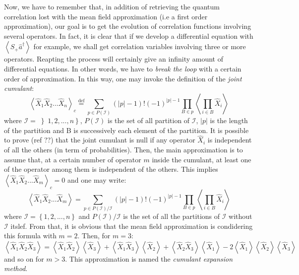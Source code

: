 \documentclass[12pt]{report}
\begin{document}
Now, we have to remember that, in addition of retrieving the quantum correlation lost with the mean field approximation (i.e a first order approximation), our goal is to get the evolution of correlation functions involving several operators. In fact, it is clear that if we develop a differential equation with $\left\langle\hat{S}_+ \hat{a}^\dagger\right\rangle$ for example, we shall get correlation variables involving three or more operators. Reapting the process will certainly give an infinity amount of differential equations. In other words, we have to \textit{break the loop} with a certain order of approximation. In this way, one may invoke the definition of the \textit{joint cumulant}:
\begin{equation}
\left\langle\hat{X}_1\hat{X}_2...\hat{X}_n\right\rangle_c \stackrel{\text{def}}{=} \sum_{p \in P(\mathcal{I})} (\vert p \vert - 1)!(-1)^{\vert p \vert -1} \prod_{B \in p} \left\langle \prod_{i \in B}\hat{X}_i\right\rangle
\end{equation}
where $\mathcal{I} = \left\rbrace 1,2, ..., n \right\rbrace$, $P(\mathcal{I})$ is the set of all partition of $\mathcal{I}$, $\vert p \vert$ is the length of the partition and B is successively each element of the partition. It is possible to prove (ref ??) that the joint cumulant is null if any operator $\hat{X}_i$ is independent of all the others (in term of probabilities). Then, the main approximation is to assume that, at a certain number of operator $m$ inside the cumulant, at least one of the operator among them is independent of the others. This implies $\left\langle\hat{X}_1\hat{X}_2...\hat{X}_m\right\rangle_c = 0$ and one may write:
\begin{equation}
\left\langle\hat{X}_1\hat{X}_2...\hat{X}_m\right\rangle = \sum_{p \in P(\mathcal{I})/\mathcal{I}} (\vert p \vert - 1)!(-1)^{\vert p \vert -1} \prod_{B \in p} \left\langle \prod_{i \in B}\hat{X}_i\right\rangle
\end{equation}
where $\mathcal{I} = \left\lbrace 1,2, ..., n \right\rbrace$ and $P(\mathcal{I})/\mathcal{I}$ is the set of all the partitions of $\mathcal{I}$ without $\mathcal{I}$ itslef. From that, it is obvious that the mean field approximation is condidering  this formula  with $m=2$. Then, for $m=3$:
\begin{equation}
\left\langle\hat{X}_1\hat{X}_2\hat{X}_3\right\rangle = \left\langle\hat{X}_1\hat{X}_2\right\rangle\left\langle\hat{X}_3\right\rangle + \left\langle\hat{X}_1\hat{X}_3\right\rangle\left\langle\hat{X}_2\right\rangle + \left\langle\hat{X}_2\hat{X}_3\right\rangle\left\langle\hat{X}_1\right\rangle - 2\left\langle\hat{X}_1\right\rangle\left\langle\hat{X}_2\right\rangle\left\langle\hat{X}_3\right\rangle
\end{equation}
and so on for $m>3$. This approximation is named the \textit{cumulant expansion method}.
\end{document}
